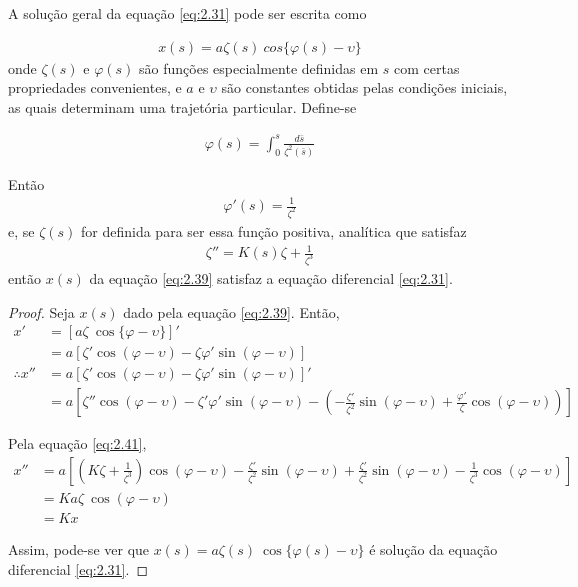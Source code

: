 A solução geral da equação \eqref{eq:2.31} pode ser escrita como
	
\begin{align}
	x(s) = a\zeta(s)\ cos\{\varphi(s)-\upsilon\}\label{eq:2.39}
\end{align}
onde $\zeta(s)$ e $\varphi(s)$ são funções especialmente definidas em $s$ com certas propriedades convenientes, e $a$ e $\upsilon$ são constantes obtidas pelas condições iniciais, as quais determinam uma trajetória particular. Define-se
	
\begin{align}
	\varphi(s) = \int_{0}^{s} \frac{d\bar{s}}{\zeta^2(\bar{s})}
\end{align}
	
Então
\begin{align}
	\varphi'(s) = \frac{1}{\zeta^2}
\end{align}
e, se $\zeta(s)$ for definida para ser essa função positiva, analítica que satisfaz
\begin{align}
	\zeta'' = K(s)\zeta+\frac{1}{\zeta^3}\label{eq:2.41}
\end{align}
então $x(s)$ da equação \eqref{eq:2.39} satisfaz a equação diferencial \eqref{eq:2.31}.
	
\begin{proof}
	Seja $x(s)$ dado pela equação \eqref{eq:2.39}. Então,
	\begin{align*}
        x' &= [a\zeta\ \cos\{\varphi-\upsilon\}]'\\
        &= a[\zeta'\cos(\varphi-\upsilon)-\zeta\varphi'\sin(\varphi-\upsilon)]\\
        \therefore x'' &= a[\zeta'\cos(\varphi-\upsilon)-\zeta\varphi'\sin(\varphi-\upsilon)]'\\
        &= a\left[\zeta''\cos(\varphi-\upsilon)-\zeta'\varphi'\sin(\varphi-\upsilon) - \left(-\frac{\zeta'}{\zeta^2}\sin(\varphi-\upsilon)+\frac{\varphi'}{\zeta}\cos(\varphi-\upsilon)\right)\right]
	\end{align*}
	
	Pela equação \eqref{eq:2.41}, 
	\begin{align*}
        x'' &= a\left[\left(K\zeta+\frac{1}{\zeta^3}\right)\cos(\varphi-\upsilon)-\frac{\zeta'}{\zeta^2}\sin(\varphi-\upsilon) + \frac{\zeta'}{\zeta^2}\sin(\varphi-\upsilon)-\frac{1}{\zeta^3}\cos(\varphi-\upsilon)\right]\\
        &= Ka\zeta\ \cos(\varphi-\upsilon)\\
        &= Kx
	\end{align*}
	
	Assim, pode-se ver que $x(s) = a\zeta(s)\ \cos\{\varphi(s)-\upsilon\}$ é solução da equação diferencial \eqref{eq:2.31}.
\end{proof}
	
